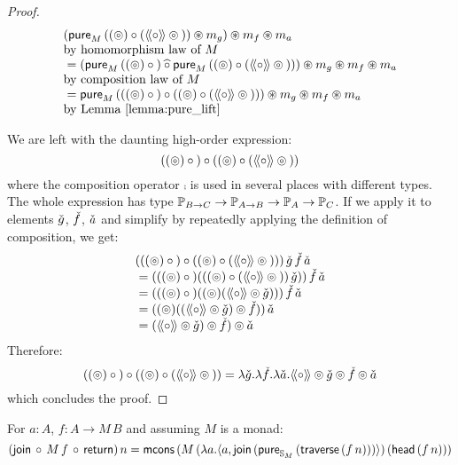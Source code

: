 \documentclass{article}
\newenvironment{lemma}[1]{%
  \renewcommand\thelemmainner{#1}%
  \lemmainner
}{\endlemmainner}
\begin{document}
\begin{proof}
$$\begin{array}{ll}
     (\mathsf{pure}_M\,((\circledcirc) \circ (\mathopen{\langle\!\langle}{\circ}\mathclose{\rangle\!\rangle} \circledcirc {}))
       \circledast m_g)
    \circledast m_f \circledast m_a\\
 \mbox{by homomorphism law of }M\\
{}= (\mathsf{pure}_M\,((\circledcirc) \circ {}) \mathbin{\widehat{\circ}}
     \mathsf{pure}_M\,((\circledcirc) \circ (\mathopen{\langle\!\langle}{\circ}\mathclose{\rangle\!\rangle} \circledcirc {})))
    \circledast m_g \circledast m_f \circledast m_a\\
\mbox{by composition law of }M\\
{}= \mathsf{pure}_M\,(((\circledcirc) \circ {}) \circ
                ((\circledcirc) \circ (\mathopen{\langle\!\langle}{\circ}\mathclose{\rangle\!\rangle} \circledcirc {})))
    \circledast m_g \circledast m_f \circledast m_a\\
\mbox{by Lemma \ref{lemma:pure_lift}}
\end{array}
$$

We are left with the daunting high-order expression:
$$
((\circledcirc) \circ {}) \circ ((\circledcirc) \circ (\mathopen{\langle\!\langle}{\circ}\mathclose{\rangle\!\rangle} \circledcirc {}))
$$
where the composition operator $\comp$ is used in several places with different types.
The whole expression has type $\mathbb{P}_{B\rightarrow C}\rightarrow \mathbb{P}_{A\rightarrow B} \rightarrow \mathbb{P}_{A}\rightarrow \mathbb{P}_{C}$.
If we apply it to elements $\check{g}$, $\check{f}$, $\check{a}$ and simplify by repeatedly applying the definition of composition, we get:
$$
\begin{array}{l}
(((\pappl) \comp {}) \comp ((\pappl) \comp (\ppair{\comp} \pappl {})))\,
\pstr{g}\,\pstr{f}\,\pstr{a}\\
{}= (((\pappl) \comp {}) (((\pappl) \comp (\ppair{\comp} \pappl {}))\,\pstr{g}))\,
    \pstr{f}\,\pstr{a}\\
{}= (((\pappl) \comp {}) ((\pappl) (\ppair{\comp} \pappl\pstr{g})))\,
    \pstr{f}\,\pstr{a}\\
{}= ((\pappl) ((\ppair{\comp} \pappl\pstr{g}) \pappl \pstr{f}))\,\pstr{a}\\
{}= (\ppair{\comp} \pappl\pstr{g}) \pappl \pstr{f})\pappl\pstr{a}\\
\end{array}
$$
Therefore:
$$
((\circledcirc) \circ {}) \circ ((\circledcirc) \circ (\mathopen{\langle\!\langle}{\circ}\mathclose{\rangle\!\rangle} \circledcirc {}))
= \lambda \check{g}. \lambda \check{f}. \lambda \check{a}.
  \mathopen{\langle\!\langle}{\circ}\mathclose{\rangle\!\rangle} \circledcirc\check{g} \circledcirc \check{f} \circledcirc\check{a}
$$
which concludes the proof.
\end{proof}


\begin{lemma}{18}\label{lemma:general_bind_law}
For $a : A$, $f : A \rightarrow M\, B$ and assuming $M$ is a monad:
$$
(\mathsf{join}\, \circ\,  M\, f\, \circ\, \mathsf{return})\, n = \mathsf{mcons}\, (M\,(\lambda a . \langle a, \mathsf{join}\, (\mathsf{pure}_{\mathbb{S}_{M}}\, (\mathsf{traverse}\, (f\, n))) \rangle)\, (\mathsf{head}\, (f\, n)))
$$
\end{lemma}
\end{document}
